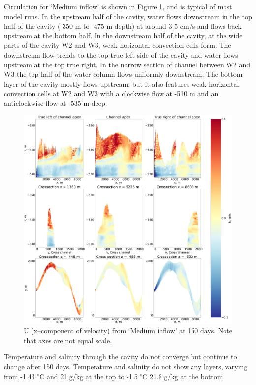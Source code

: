Circulation for `Medium inflow' is shown in Figure \ref{fig:medium_flow_circulation}, and is typical of most model runs.
In the upstream half of the cavity, water flows downstream in the top half of the cavity (-350 m to -475 m depth) at around 3-5 cm/s and flows back upstream at the bottom half. In the downstream half of the cavity, at the wide parts of the cavity W2 and W3, weak horizontal convection cells form. The downstream flow trends to the top true left side of the cavity and water flows upstream at the top true right. In the narrow section of channel between W2 and W3 the top half of the water column flows uniformly downstream. 
The bottom layer of the cavity mostly flows upstream, but it also features weak horizontal convection cells at W2 and W3 with a clockwise flow at -510 m and an anticlockwise flow at -535 m deep. 

\begin{figure}[!ht]
\centering
\includegraphics[width=1\textwidth]{chapters/4/medium_flow_circulation.png}
\caption[Medium inflow (U)]{U (x--component of velocity) from `Medium inflow' at 150 days. Note that axes are not equal scale.}
\label{fig:medium_flow_circulation}
\end{figure}


Temperature and salinity through the cavity do not converge but continue to change after 150 days. Temperature and salinity do not show any layers, varying from -1.43 $^{\circ}$C and 21  g/kg at the top to -1.5 $^{\circ}$C 21.8  g/kg at the bottom. 

